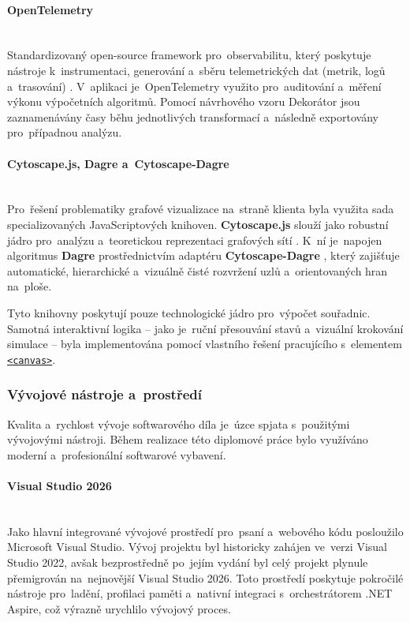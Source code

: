 \documentclass[
  master,
  program=ainfvs,
  printversion,
  figures=false,
  tables=false,
  glossaries,
  index
]{kidiplom}
\begin{document}
\paragraph{OpenTelemetry} \mbox{} \\
Standardizovaný open-source framework pro~observabilitu, který poskytuje nástroje k~instrumentaci, generování a~sběru telemetrických dat (metrik, logů a~trasování) \cite{opentelemetry_docs}. V~aplikaci je~OpenTelemetry využito pro~auditování a~měření výkonu výpočetních algoritmů. Pomocí návrhového vzoru Dekorátor jsou zaznamenávány časy běhu jednotlivých transformací a~následně exportovány pro~případnou analýzu.

\paragraph{Cytoscape.js, Dagre a~Cytoscape-Dagre} \mbox{} \\
Pro~řešení problematiky grafové vizualizace na~straně klienta byla využita sada specializovaných JavaScriptových knihoven. \textbf{Cytoscape.js} slouží jako robustní jádro pro~analýzu a~teoretickou reprezentaci grafových sítí \cite{cytoscape_docs}. K~ní je~napojen algoritmus \textbf{Dagre} \cite{dagre_docs} prostřednictvím adaptéru \textbf{Cytoscape-Dagre} \cite{cytoscape_dagre_docs}, který zajišťuje automatické, hierarchické a~vizuálně čisté rozvržení uzlů a~orientovaných hran na~ploše.

Tyto knihovny poskytují pouze technologické jádro pro~výpočet souřadnic. Samotná interaktivní logika – jako je~ruční přesouvání stavů a~vizuální krokování simulace – byla implementována pomocí vlastního řešení pracujícího s~elementem \hyperref[par:canvas]{\texttt{<canvas>}}.


\subsubsection{Vývojové nástroje a~prostředí}
Kvalita a~rychlost vývoje softwarového díla je~úzce spjata s~použitými vývojovými nástroji. Během realizace této diplomové práce bylo využíváno moderní a~profesionální softwarové vybavení.

\paragraph{Visual Studio 2026} \mbox{} \\
Jako hlavní integrované vývojové prostředí pro~psaní \csharp{} a~webového kódu posloužilo Microsoft Visual Studio. Vývoj projektu byl historicky zahájen ve~verzi Visual Studio 2022, avšak bezprostředně po~jejím vydání byl celý projekt plynule přemigrován na~nejnovější Visual Studio 2026. Toto prostředí poskytuje pokročilé nástroje pro~ladění, profilaci paměti a~nativní integraci s~orchestrátorem .NET Aspire, což výrazně urychlilo vývojový proces.
\end{document}
